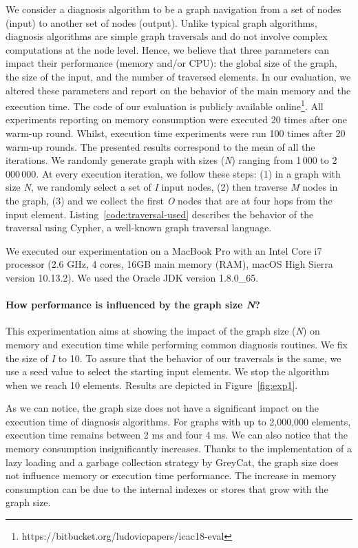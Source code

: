 We consider a diagnosis algorithm to be a graph navigation from a set of nodes (input) to another set of nodes (output).
Unlike typical graph algorithms, diagnosis algorithms are simple graph traversals and do not involve complex computations at the node level. Hence, we believe that three parameters can impact their performance (memory and/or CPU): the global size of the graph, the size of the input, and the number of traversed elements.
In our evaluation, we altered these parameters and report on the behavior of the main memory and the execution time. The code of our evaluation is publicly available online\footnote{https://bitbucket.org/ludovicpapers/icac18-eval}.
All experiments reporting on memory consumption were executed 20 times after one warm-up round. Whilst, execution time experiments were run 100 times after 20 warm-up rounds.
The presented results correspond to the mean of all the iterations.
We randomly generate graph with sizes (\textit{N}) ranging from 1\,000 to 2\,000\,000. 
At every execution iteration, we follow these steps: (1) in a graph with size \textit{N}, we randomly select a set of \textit{I} input nodes, (2) then traverse \textit{M} nodes in the graph, (3) and  we collect  the first \textit{O} nodes that are at four hops from the input element. Listing~\ref{code:traversal-used} describes the behavior of the traversal using Cypher, a well-known graph traversal language.

We executed our experimentation on a MacBook Pro with an Intel Core i7 processor (2.6 GHz, 4 cores, 16GB main memory (RAM), macOS High Sierra version 10.13.2). We used the Oracle JDK version 1.8.0\_65.

\paragraph{How performance is influenced by the graph size \textit{N}?}

This experimentation aims at showing the impact of the graph size (\textit{N}) on memory and execution time while performing common diagnosis routines.
We fix the size of \textit{I} to 10. To assure that the behavior of our traversals is the same, we use a seed value to select the starting input elements. We stop the algorithm when we reach 10 elements.
Results are depicted in Figure~\ref{fig:exp1}.

As we can notice, the graph size does not have a significant impact on the execution time of diagnosis algorithms.
For graphs with up to 2,000,000 elements, execution time remains between 2 ms and four 4 ms. We can also notice that the memory consumption insignificantly increases.
Thanks to the implementation of a lazy loading and a garbage collection strategy by GreyCat, the graph size does not influence memory or execution time performance. The increase in memory consumption can be due to the internal indexes or stores that grow with the graph size.


